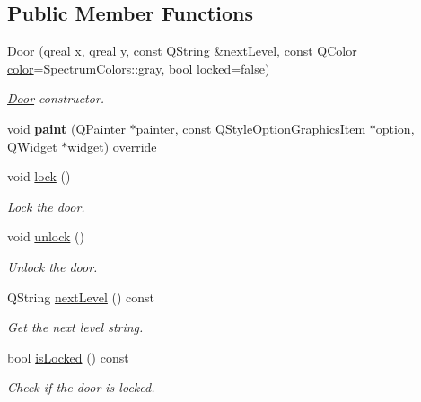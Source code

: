 \subsection*{Public Member Functions}
\begin{DoxyCompactItemize}
\item 
\hyperlink{class_door_a71aa016de294167ab3b49ffc34b96ae3}{Door} (qreal x, qreal y, const Q\+String \&\hyperlink{class_door_a2ed65424b864f28dc980205c38ebd1d9}{next\+Level}, const Q\+Color \hyperlink{class_entity_ad14bf88ca550e2e5b13438a3faf545e6}{color}=Spectrum\+Colors\+::gray, bool locked=false)
\begin{DoxyCompactList}\small\item\em \hyperlink{class_door}{Door} constructor. \end{DoxyCompactList}\item 
\mbox{\label{class_door_a067d41ca1562d3b808c0909e2642ade7}} 
void {\bfseries paint} (Q\+Painter $\ast$painter, const Q\+Style\+Option\+Graphics\+Item $\ast$option, Q\+Widget $\ast$widget) override
\item 
\mbox{\label{class_door_a5cce5b5437aa1d7c9903d087939fb629}} 
void \hyperlink{class_door_a5cce5b5437aa1d7c9903d087939fb629}{lock} ()
\begin{DoxyCompactList}\small\item\em Lock the door. \end{DoxyCompactList}\item 
\mbox{\label{class_door_af3d28c72297ed05c0361fb705b3db47f}} 
void \hyperlink{class_door_af3d28c72297ed05c0361fb705b3db47f}{unlock} ()
\begin{DoxyCompactList}\small\item\em Unlock the door. \end{DoxyCompactList}\item 
Q\+String \hyperlink{class_door_a2ed65424b864f28dc980205c38ebd1d9}{next\+Level} () const
\begin{DoxyCompactList}\small\item\em Get the next level string. \end{DoxyCompactList}\item 
bool \hyperlink{class_door_ab72060b0c9bbfa00dcc2f02952927dba}{is\+Locked} () const
\begin{DoxyCompactList}\small\item\em Check if the door is locked. \end{DoxyCompactList}\item 

\end{DoxyCompactItemize}
